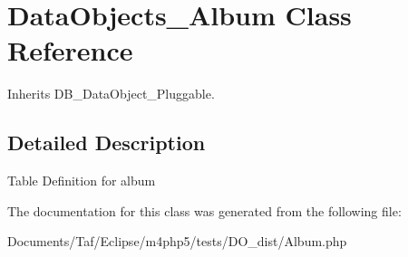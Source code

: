 \hypertarget{classDataObjects__Album}{
\section{DataObjects\_\-Album Class Reference}
\label{classDataObjects__Album}
}
Inherits DB\_\-DataObject\_\-Pluggable.



\subsection{Detailed Description}
Table Definition for album 

The documentation for this class was generated from the following file:\begin{CompactItemize}
\item 
Documents/Taf/Eclipse/m4php5/tests/DO\_\-dist/Album.php\end{CompactItemize}

